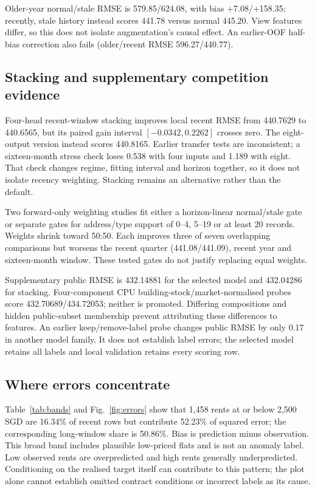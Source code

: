 \documentclass[conference]{IEEEtran}
\begin{document}
Older-year normal/stale RMSE is 579.85/624.08, with bias +7.08/+158.35; recently, stale history instead scores 441.78 versus normal 445.20. View features differ, so this does not isolate augmentation's causal effect. An earlier-OOF half-bias correction also fails (older/recent RMSE 596.27/440.77).

\subsection{Stacking and supplementary competition evidence}
Four-head recent-window stacking improves local recent RMSE from 440.7629 to 440.6565, but its paired gain interval $[-0.0342,0.2262]$ crosses zero. The eight-output version instead scores 440.8165. Earlier transfer tests are inconsistent; a sixteen-month stress check loses 0.538 with four inputs and 1.189 with eight. That check changes regime, fitting interval and horizon together, so it does not isolate recency weighting. Stacking remains an alternative rather than the default.

Two forward-only weighting studies fit either a horizon-linear normal/stale gate or separate gates for address/type support of 0--4, 5--19 or at least 20 records. Weights shrink toward 50:50. Each improves three of seven overlapping comparisons but worsens the recent quarter (441.08/441.09), recent year and sixteen-month window. These tested gates do not justify replacing equal weights.

Supplementary public RMSE is 432.14881 for the selected model and 432.04286 for stacking. Four-component CPU building-stock/market-normalised probes score 432.70689/434.72053; neither is promoted. Differing compositions and hidden public-subset membership prevent attributing these differences to features. An earlier keep/remove-label probe changes public RMSE by only 0.17 in another model family. It does not establish label errors; the selected model retains all labels and local validation retains every scoring row.

\subsection{Where errors concentrate}
Table~\ref{tab:bands} and Fig.~\ref{fig:errors} show that 1,458 rents at or below 2,500 SGD are 16.34\% of recent rows but contribute 52.23\% of squared error; the corresponding long-window share is 50.86\%. Bias is prediction minus observation. This broad band includes plausible low-priced flats and is not an anomaly label. Low observed rents are overpredicted and high rents generally underpredicted. Conditioning on the realised target itself can contribute to this pattern; the plot alone cannot establish omitted contract conditions or incorrect labels as its cause.
\end{document}
